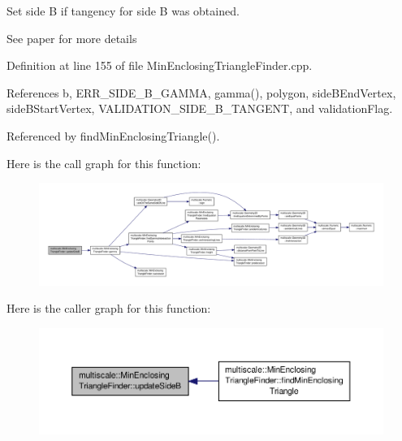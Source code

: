 Set side B if tangency for side B was obtained. 

See paper for more details 

Definition at line 155 of file Min\-Enclosing\-Triangle\-Finder.\-cpp.



References b, E\-R\-R\-\_\-\-S\-I\-D\-E\-\_\-\-B\-\_\-\-G\-A\-M\-M\-A, gamma(), polygon, side\-B\-End\-Vertex, side\-B\-Start\-Vertex, V\-A\-L\-I\-D\-A\-T\-I\-O\-N\-\_\-\-S\-I\-D\-E\-\_\-\-B\-\_\-\-T\-A\-N\-G\-E\-N\-T, and validation\-Flag.



Referenced by find\-Min\-Enclosing\-Triangle().



Here is the call graph for this function\-:\nopagebreak
\begin{figure}[H]
\begin{center}
\leavevmode
\includegraphics[width=350pt]{classmultiscale_1_1MinEnclosingTriangleFinder_ab25b3b5dbe05cb06e83a49cd28b3116f_cgraph}
\end{center}
\end{figure}




Here is the caller graph for this function\-:\nopagebreak
\begin{figure}[H]
\begin{center}
\leavevmode
\includegraphics[width=350pt]{classmultiscale_1_1MinEnclosingTriangleFinder_ab25b3b5dbe05cb06e83a49cd28b3116f_icgraph}
\end{center}
\end{figure}


